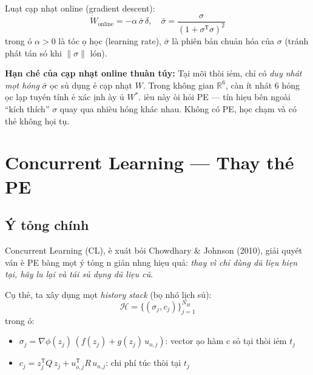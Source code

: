 \documentclass[12pt,a4paper]{article}
\newcommand{\R}{\mathbb{R}}
\newcommand{\T}{\mathsf{T}}
\begin{document}
Lu\d{a}t c\d{a}p nh\d{a}t online (gradient descent):
\begin{equation}\label{eq:online_update}
    \dot{W}_\text{online} = -\alpha\, \bar{\sigma}\, \delta, \quad \bar{\sigma} = \frac{\sigma}{(1+\sigma^\T\sigma)^2}
\end{equation}
trong \dj\'{o} $\alpha > 0$ l\`{a} t\'{o}c \dj\d{o} h\d{o}c (learning rate), $\bar{\sigma}$ l\`{a} phi\^{e}n b\h{a}n chu\h{a}n h\'{o}a c\h{u}a $\sigma$ (tr\'{a}nh ph\'{a}t t\'{a}n s\'{o} khi $\|\sigma\|$ l\'{o}n).

\textbf{H\d{a}n ch\'{e} c\h{u}a c\d{a}p nh\d{a}t online thu\`{a}n t\'{u}y:} T\d{a}i m\~{o}i th\`{o}i \dj i\h{e}m, ch\h{i} c\'{o} \textit{duy nh\'{a}t m\d{o}t h\uhorn{}\'{o}ng} $\bar{\sigma}$ \dj\uhorn{}\d{o}c s\h{u} d\d{u}ng \dj\h{e} c\d{a}p nh\d{a}t $W$. Trong kh\^{o}ng gian $\R^6$, c\`{a}n \'{i}t nh\'{a}t 6 h\uhorn{}\'{o}ng \dj\d{o}c l\d{a}p tuy\'{e}n t\'{i}nh \dj\h{e} x\'{a}c \dj\d{i}nh \dj\`{a}y \dj\h{u} $W^*$. \DJ i\`{e}u n\`{a}y \dj\`{o}i h\h{o}i PE --- t\'{i}n hi\d{e}u b\^{e}n ngo\`{a}i ``k\'{i}ch th\'{i}ch'' $\sigma$ quay qua nhi\`{e}u h\uhorn{}\'{o}ng kh\'{a}c nhau. Kh\^{o}ng c\'{o} PE, h\d{o}c ch\d{a}m v\`{a} c\'{o} th\h{e} kh\^{o}ng h\d{o}i t\d{u}.

\section{Concurrent Learning --- Thay th\'{e} PE}

\subsection{\'{Y} t\uhorn{}\h{o}ng ch\'{i}nh}

Concurrent Learning (CL), \dj\`{e} xu\'{a}t b\h{o}i Chowdhary \& Johnson (2010), gi\h{a}i quy\'{e}t v\'{a}n \dj\`{e} PE b\`{a}ng m\d{o}t \'{y} t\uhorn{}\h{o}ng \dj\ohorn{}n gi\h{a}n nh\uhorn{}ng hi\d{e}u qu\h{a}: \textit{thay v\`{i} ch\h{i} d\`{u}ng d\~{u} li\d{e}u hi\d{e}n t\d{a}i, h\~{a}y l\uhorn{}u l\d{a}i v\`{a} t\'{a}i s\h{u} d\d{u}ng d\~{u} li\d{e}u c\~{u}}.

C\d{u} th\h{e}, ta x\^{a}y d\d{u}ng m\d{o}t \textit{history stack} (b\d{o} nh\'{o} l\d{i}ch s\h{u}):
\begin{equation}
    \mathcal{H} = \big\{ (\sigma_j, c_j) \big\}_{j=1}^{N_H}
\end{equation}
trong \dj\'{o}:
\begin{itemize}[nosep]
    \item $\sigma_j = \nabla\phi(z_j)\,(f(z_j) + g(z_j)\,u_{o,j})$: vector \dj\d{a}o h\`{a}m c\ohorn{} s\h{o} t\d{a}i th\`{o}i \dj i\h{e}m $t_j$
    \item $c_j = z_j^\T Q\, z_j + u_{o,j}^\T R\, u_{o,j}$: chi ph\'{i} t\'{u}c th\`{o}i t\d{a}i $t_j$
\end{itemize}
\end{document}
